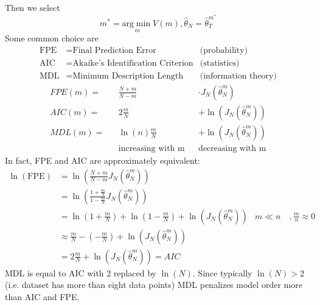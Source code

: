 Then we select
\begin{equation*}
m^{*} =\underset{m}{\mathrm{arg}\min} V(m) ,\hat{\theta }_{N} =\hat{\theta }_{T}^{m^{*}}
\end{equation*}
Some common choice are
\begin{align*}
\text{FPE} & =\text{Final Prediction Error} & \text{(probability)}\\
\text{AIC} & =\text{Akaike's Identification Criterion} & \text{(statistics)}\\
\text{MDL} & =\text{Minimum Description Length} & \text{(information theory)}
\end{align*}
\begin{equation*}
 \begin{aligned}
FPE(m) = & & \frac{N+m}{N-m}  & & \cdotp J_{N}\left(\hat{\theta }_{N}^{m}\right)\\
AIC(m) = & & 2\frac{m}{N}  & & +\ln\left(J_{N}\left(\hat{\theta }_{N}^{m}\right)\right)\\
MDL(m) = & & \ln(n)\frac{m}{N} & & +\ln\left(J_{N}\left(\hat{\theta }_{N}^{m}\right)\right)\\
 & & \text{increasing with m} & & \text{decreasing with m}
\end{aligned}
\end{equation*}
In fact, FPE and AIC are approximately equivalent:
\begin{equation*}
\begin{aligned}
\ln(\text{FPE}) & =\ln\left(\frac{N+m}{N-m} J_{N}\left(\hat{\theta }_{N}^{m}\right)\right) &  & \\
 & =\ln\left(\frac{1+\frac{m}{N}}{1-\frac{m}{N}} J_{N}\left(\hat{\theta }_{N}^{m}\right)\right) &  & \\
 & =\ln\left(1+\frac{m}{N}\right) +\ln\left(1-\frac{m}{N}\right) +\ln\left(J_{N}\left(\hat{\theta }_{N}^{m}\right)\right) & m\ll n & \ , \frac{m}{n} \approx 0\\
 & \approx \frac{m}{N} -\left(-\frac{m}{N}\right) +\ln\left(J_{N}\left(\hat{\theta }_{N}^{m}\right)\right) &  & \\
 & =2\frac{m}{N} +\ln\left(J_{N}\left(\hat{\theta }_{N}^{m}\right)\right) =AIC &  & 
\end{aligned}
\end{equation*}
MDL is equal to AIC with 2 replaced by $ \ln(N)$. Since typically $ \ln(N)  >2$ (i.e. dataset has more than eight data points) MDL penalizes model order more than AIC and FPE.